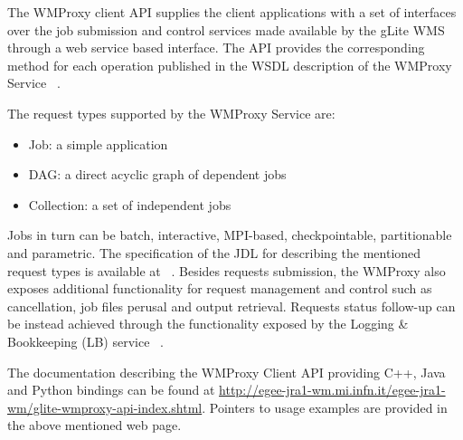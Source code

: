 
The WMProxy client API supplies the client applications with a set of 
interfaces over the job submission and control services made available 
by the gLite WMS through a web service based interface. 
The API provides the corresponding method for each operation published in the
WSDL description of the WMProxy Service ~\cite{wmproxy-wsdl}. 

The request types supported by the WMProxy Service are:
\begin{itemize}
  \item Job: a simple application
  \item DAG: a direct acyclic graph of dependent jobs
  \item Collection: a set of independent jobs
\end{itemize}

Jobs in turn can be batch, interactive, MPI-based, checkpointable,
partitionable and parametric. The specification of the JDL for describing the 
mentioned request types is available at ~\cite{JDL}.
Besides requests submission, the WMProxy also exposes additional
functionality for request management and control such as cancellation, job files perusal and
output retrieval. Requests status follow-up can be instead achieved through
the functionality exposed by the Logging \& Bookkeeping (LB) service ~\cite{LB}.

The documentation describing the WMProxy Client API providing C++, Java and Python bindings 
can be found at \url{http://egee-jra1-wm.mi.infn.it/egee-jra1-wm/glite-wmproxy-api-index.shtml}.
Pointers to usage examples are provided in the above mentioned web page. 

